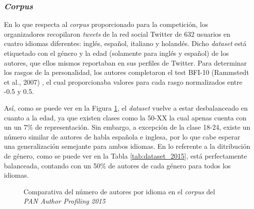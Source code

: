 \subsubsection{\textit{Corpus}}

\bigskip
En lo que respecta al \textit{corpus} proporcionado para la competición, los organizadores recopilaron \textit{tweets} de la red social Twitter
de 632 usuarios en cuatro idiomas diferentes: inglés, español, italiano y holandés. Dicho \textit{dataset} está etiquetado con el género y la edad
(solamente para inglés y español) de los autores, que ellos mismos reportaban en sus perfiles de Twitter. Para determinar los rasgos de la personalidad,
los autores completaron el test BFI-10 (Rammstedt et al., 2007) \cite{rammstedt2007measuring}, el cual proporcionaba valores para cada rasgo normalizados entre -0.5 y 0.5.

\bigskip
Así, como se puede ver en la Figura \ref{fig:dataset_2015}, el \textit{dataset} vuelve a estar desbalanceado en cuanto a la edad, ya que existen
clases como la 50-XX la cual apenas cuenta con un un 7\% de representación. Sin embargo,
a excepción de la clase 18-24, existe un número similar de autores de habla española e inglesa, por lo que cabe esperar una generalización
semejante para ambos idiomas. En lo referente a la ditribución de género, como se puede ver en la Tabla \ref{tab:dataset_2015}, está perfectamente balanceada,
contando con un 50\% de autores de cada género para todos los idiomas.

\bigskip
\begin{figure}[H]
	\centering
	\caption{Comparativa del número de autores por idioma en el \textit{corpus} del \textit{PAN Author Profiling 2015}}
	\label{fig:dataset_2015}
\end{figure}

